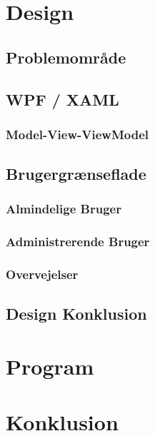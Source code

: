 \chapter{Design}

\section{Problemområde}

\section{WPF / XAML}
\subsection{Model-View-ViewModel}

\section{Brugergrænseflade}
%
\subsection{Almindelige Bruger}
%
\subsection{Administrerende Bruger}
%
\subsection{Overvejelser}
%

\section{Design Konklusion}
%

\chapter{Program}


\chapter{Konklusion}
